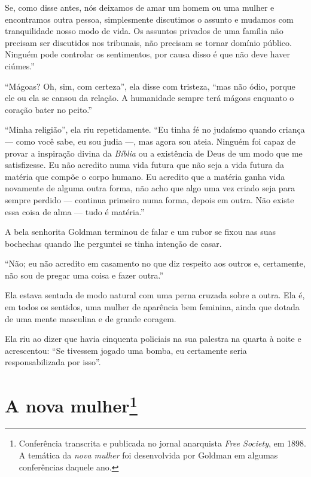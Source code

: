 Se, como disse antes, nós deixamos de amar um homem ou uma
mulher e encontramos outra pessoa, simplesmente discutimos o assunto e mudamos
com tranquilidade nosso modo de vida. Os assuntos privados de uma família
não precisam ser discutidos nos tribunais, não precisam se tornar
domínio público. Ninguém pode controlar os sentimentos, por causa disso
é que não deve haver ciúmes.''

``Mágoas? Oh, sim, com certeza'', ela disse com tristeza, ``mas não
ódio, porque ele ou ela se cansou da relação. A humanidade sempre terá
mágoas enquanto o coração bater no peito.''

``Minha religião'', ela riu repetidamente. ``Eu tinha fé no judaísmo
quando criança --- como você sabe, eu sou judia ---, mas agora sou ateia.
Ninguém foi capaz de provar a inspiração divina da \emph{Bíblia} ou a
existência de Deus de um modo que me satisfizesse. Eu não acredito numa
vida futura que não seja a vida futura da matéria que compõe o corpo
humano. Eu acredito que a matéria ganha vida novamente de alguma outra
forma, não acho que algo uma vez criado seja para sempre perdido --- continua primeiro numa forma, depois em outra. Não existe essa
coisa de alma --- tudo é matéria.''

A bela senhorita Goldman terminou de falar e um rubor se fixou nas suas
bochechas quando lhe perguntei se tinha intenção de casar.

``Não; eu não acredito em casamento no que diz respeito aos outros e,
certamente, não sou de pregar uma coisa e fazer outra.''

Ela estava sentada de modo natural com uma perna cruzada sobre a outra.
Ela é, em todos os sentidos, uma mulher de aparência bem feminina, ainda
que dotada de uma mente masculina e de grande coragem.

Ela riu ao dizer que havia cinquenta policiais na sua palestra na quarta
à noite e acrescentou: ``Se tivessem jogado uma bomba, eu certamente
seria responsabilizada por isso''.

\chapter{A nova mulher\footnote{Conferência transcrita e publicada no jornal
  anarquista \emph{Free Society}, em 1898. A temática da \textit{nova mulher} foi
  desenvolvida por Goldman em algumas conferências daquele ano.}}

